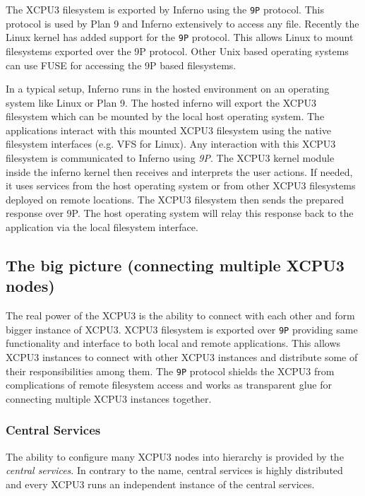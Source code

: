 The XCPU3 filesystem is exported by Inferno using the \texttt{9P} protocol. 
This protocol is used by Plan 9 and Inferno extensively to access any file. 
Recently the Linux kernel has added support for the \texttt{9P}
protocol\cite{graverobbers}.  This allows Linux to mount filesystems
exported over the 9P protocol.  Other Unix based operating systems can use
FUSE\cite{FUSE} for accessing the 9P based filesystems. 

In a typical setup, Inferno runs in the hosted environment on an operating
system like Linux or Plan 9.  The hosted inferno will export the XCPU3
filesystem which can be mounted by the local host operating system. The 
applications interact with this mounted XCPU3 filesystem using the native
filesystem interfaces (e.g. VFS for Linux). Any interaction with this XCPU3
filesystem is communicated to Inferno using \textit{9P}. The XCPU3 kernel module
inside the inferno kernel then receives and interprets the user actions.  If
needed, it uses services from the host operating system or from other XCPU3
filesystems deployed on remote locations.  The XCPU3 filesystem then sends the
prepared response over 9P. The host operating system will relay this response
back to the application via the local filesystem interface.


\subsection{The big picture (connecting multiple XCPU3 nodes)}
The real power of the XCPU3 is the ability to connect with each other and form
bigger instance of XCPU3.  XCPU3 filesystem is exported over \texttt{9P}
providing same functionality and interface to both local and remote
applications.  This allows XCPU3 instances to connect with other XCPU3
instances and distribute some of their responsibilities among them.
The \texttt{9P} protocol shields the XCPU3 from complications of remote
filesystem access and works as transparent glue for connecting multiple XCPU3
instances together.

\subsubsection{Central Services}

The ability to configure many XCPU3 nodes into hierarchy is provided by the
\textit{central services}.  In contrary to the name, central services is
highly distributed and every XCPU3 runs an independent instance of the central
services.  


